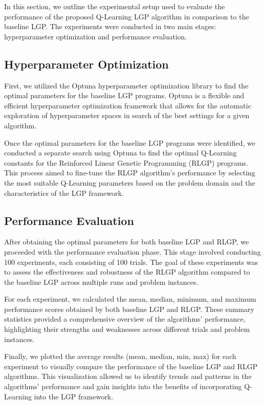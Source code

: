 \documentclass[12pt, final]{dalcsthesis}
\begin{document}
In this section, we outline the experimental setup used to evaluate the performance of the proposed Q-Learning LGP algorithm in comparison to the baseline LGP. The experiments were conducted in two main stages: hyperparameter optimization and performance evaluation.

\subsection{Hyperparameter Optimization}

First, we utilized the Optuna hyperparameter optimization library \cite{akiba2019optuna} to find the optimal parameters for the baseline LGP programs. Optuna is a flexible and efficient hyperparameter optimization framework that allows for the automatic exploration of hyperparameter spaces in search of the best settings for a given algorithm.

Once the optimal parameters for the baseline LGP programs were identified, we conducted a separate search using Optuna to find the optimal Q-Learning constants for the Reinforced Linear Genetic Programming (RLGP) programs. This process aimed to fine-tune the RLGP algorithm's performance by selecting the most suitable Q-Learning parameters based on the problem domain and the characteristics of the LGP framework.

\subsection{Performance Evaluation}

After obtaining the optimal parameters for both baseline LGP and RLGP, we proceeded with the performance evaluation phase. This stage involved conducting 100 experiments, each consisting of 100 trials. The goal of these experiments was to assess the effectiveness and robustness of the RLGP algorithm compared to the baseline LGP across multiple runs and problem instances.

For each experiment, we calculated the mean, median, minimum, and maximum performance scores obtained by both baseline LGP and RLGP. These summary statistics provided a comprehensive overview of the algorithms' performance, highlighting their strengths and weaknesses across different trials and problem instances.

Finally, we plotted the average results (mean, median, min, max) for each experiment to visually compare the performance of the baseline LGP and RLGP algorithms. This visualization allowed us to identify trends and patterns in the algorithms' performance and gain insights into the benefits of incorporating Q-Learning into the LGP framework.
\end{document}
